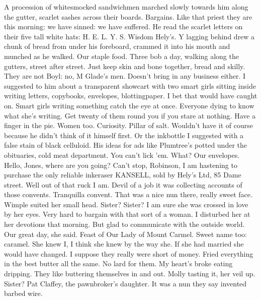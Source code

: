  A procession of whitesmocked sandwichmen marched slowly towards
him along the gutter, scarlet sashes across their boards. Bargains. Like
that priest they are this morning: we have sinned: we have suffered. He
read the scarlet letters on their five tall white hats: H. E. L. Y. S.
Wisdom Hely's. Y lagging behind drew a chunk of bread from under his
foreboard, crammed it into his mouth and munched as he walked. Our staple
food. Three bob a day, walking along the gutters, street after street.
Just keep skin and bone together, bread and skilly. They are not Boyl:
no, M Glade's men. Doesn't bring in any business either. I suggested
to him about a transparent showcart with two smart girls sitting
inside writing letters, copybooks, envelopes, blottingpaper. I bet that
would have caught on. Smart girls writing something catch the eye at once.
Everyone dying to know what she's writing. Get twenty of them round you
if you stare at nothing. Have a finger in the pie. Women too. Curiosity.
Pillar of salt. Wouldn't have it of course because he didn't think
of it himself first. Or the inkbottle I suggested with a false stain
of black celluloid. His ideas for ads like Plumtree's potted under
the obituaries, cold meat department. You can't lick 'em. What? Our
envelopes. Hello, Jones, where are you going? Can't stop, Robinson,
I am hastening to purchase the only reliable inkeraser KANSELL,
sold by Hely's Ltd, 85 Dame street. Well out of that ruck I am.
Devil of a job it was collecting accounts of those convents. Tranquilla
convent. That was a nice nun there, really sweet face. Wimple suited her
small head. Sister? Sister? I am sure she was crossed in love by her eyes.
Very hard to bargain with that sort of a woman. I disturbed her at her
devotions that morning. But glad to communicate with the outside world.
Our great day, she said. Feast of Our Lady of Mount Carmel. Sweet name
too: caramel. She knew I, I think she knew by the way she. If she had
married she would have changed. I suppose they really were short of
money. Fried everything in the best butter all the same. No lard for them.
My heart's broke eating dripping. They like buttering themselves in and
out. Molly tasting it, her veil up. Sister? Pat Claffey, the pawnbroker's
daughter. It was a nun they say invented barbed wire.

